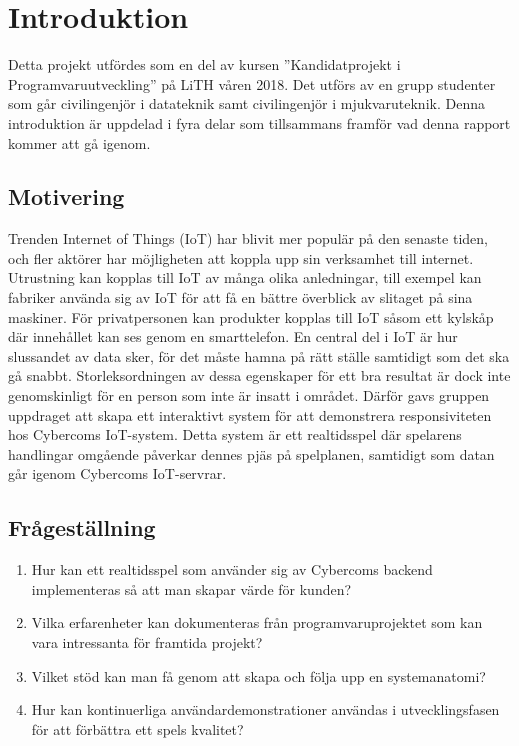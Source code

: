 \chapter{Introduktion}
\label{cha:introduction}

Detta projekt utfördes som en del av kursen ''Kandidatprojekt i Programvaruutveckling'' på LiTH våren 2018. Det utförs av en grupp studenter som går civilingenjör i datateknik samt civilingenjör i mjukvaruteknik.
Denna introduktion är uppdelad i fyra delar som tillsammans framför vad denna rapport kommer att gå igenom.

\section{Motivering}
\label{sec:motivation}
Trenden Internet of Things (IoT) har blivit mer populär på den senaste tiden\cite{IoT-ecosystem}, och fler aktörer har möjligheten att koppla upp sin verksamhet till internet. Utrustning kan kopplas till IoT av många olika anledningar, till exempel kan fabriker använda sig av IoT för att få en bättre överblick av slitaget på sina maskiner. För privatpersonen kan produkter kopplas till IoT såsom ett kylskåp där innehållet kan ses genom en smarttelefon. En central del i IoT är hur slussandet av data sker, för det måste hamna på rätt ställe samtidigt som det ska gå snabbt. Storleksordningen av dessa egenskaper för ett bra resultat är dock inte genomskinligt för en person som inte är insatt i området. Därför gavs gruppen uppdraget att skapa ett interaktivt system för att demonstrera responsiviteten hos Cybercoms IoT-system. Detta system är ett realtidsspel där spelarens handlingar omgående påverkar dennes pjäs på spelplanen, samtidigt som datan går igenom Cybercoms IoT-servrar.


\section{Frågeställning}

\begin{enumerate}
	\item \label{fs:fs_1} Hur kan ett realtidsspel som använder sig av Cybercoms backend implementeras så att man skapar värde för kunden?
	\item \label{fs:fs_2} Vilka erfarenheter kan dokumenteras från programvaruprojektet som kan vara intressanta för framtida projekt?
	\item \label{fs:fs_3} Vilket stöd kan man få genom att skapa och följa upp en systemanatomi?
	\item \label{fs:fs_4} Hur kan kontinuerliga användardemonstrationer användas i utvecklingsfasen för att förbättra ett spels kvalitet?

\end{enumerate}

